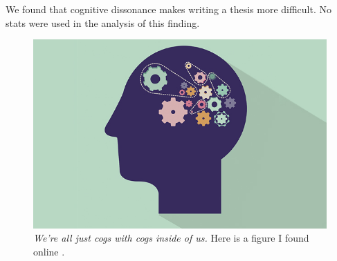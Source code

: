 We found that cognitive dissonance makes writing a thesis more difficult. No stats were used in the analysis of this finding.
\begin{figure}[H]
\centering
\includegraphics[width=.6\textwidth]{cognition/figures/CD.jpg}
\caption[We're all just cogs with cogs inside of us]
{\textit{We're all just cogs with cogs inside of us.} Here is a figure I found online \citep{CogDevUCB}.}
\end{figure}
